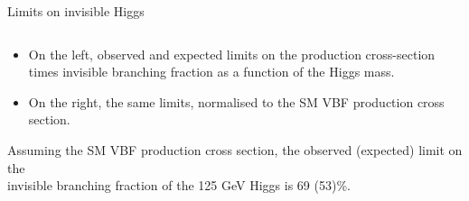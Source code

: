 \documentclass[8pt]{beamer}
\begin{document}
\begin{frame}{Limits on invisible Higgs}
\begin{columns}
\begin{block}
\end{block}

\end{columns}

\begin{itemize}
 \item On the left, observed and expected limits on the production cross-section times invisible branching fraction as a function of the Higgs mass. 
 \item On the right, the same limits, normalised to the SM VBF production cross section.
\end{itemize}

Assuming the SM VBF production cross section, the observed (expected) limit on the \\ invisible branching fraction of the 125 GeV Higgs is 69 (53)\%. 

\end{frame}
\end{document}
